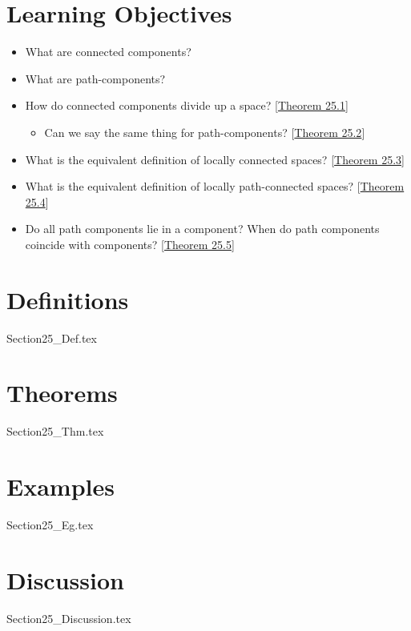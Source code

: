\section{Learning Objectives}

\begin{itemize}
    \item What are connected components?
    \item What are path-components?
    \item How do connected components divide up a space?
        [\hyperlink{thm:25.1}{Theorem 25.1}]
        \begin{itemize}
            \item Can we say the same thing for path-components?
                [\hyperlink{thm:25.2}{Theorem 25.2}]
        \end{itemize}
    \item What is the equivalent definition of locally connected spaces?
        [\hyperlink{thm:25.3}{Theorem 25.3}]
    \item What is the equivalent definition of locally path-connected spaces?
        [\hyperlink{thm:25.4}{Theorem 25.4}]
    \item Do all path components lie in a component? When do path components 
        coincide with components? [\hyperlink{thm:25.5}{Theorem 25.5}]
\end{itemize}

\section{Definitions}

{Section25_Def.tex}

\section{Theorems}

{Section25_Thm.tex}

\section{Examples}

{Section25_Eg.tex}

\section{Discussion}

{Section25_Discussion.tex}